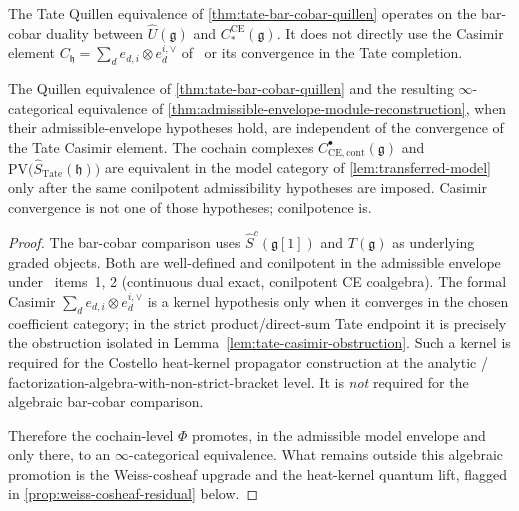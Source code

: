 The Tate Quillen equivalence of \ref{thm:tate-bar-cobar-quillen}
operates on the bar-cobar duality between $\widehat U(\mathfrak g)$
and $C_*^{\mathrm{CE}}(\mathfrak g)$. It does not directly use
the Casimir element
$C_{\mathfrak h}=\sum_d e_{d,i}\otimes e_d^{i,\vee}$
of \alpharef\ or its convergence in the Tate completion.

\begin{prop}
  \label{prop:quillen-vs-casimir}
  The Quillen equivalence of \ref{thm:tate-bar-cobar-quillen}
  and the resulting $\infty$-categorical equivalence of
  \ref{thm:admissible-envelope-module-reconstruction}, when their
  admissible-envelope hypotheses hold, are independent
  of the convergence of the Tate Casimir element. The cochain
  complexes $C^\bullet_{\mathrm{CE},\mathrm{cont}}(\mathfrak g)$
  and $\mathrm{PV}\bigl(\widehat S_{\mathrm{Tate}}(\mathfrak h)
  \bigr)$ are equivalent in the model category of
  \ref{lem:transferred-model} only after the same conilpotent
  admissibility hypotheses are imposed. Casimir convergence is not one
  of those hypotheses; conilpotence is.
\end{prop}

\begin{proof}
  The bar-cobar comparison uses
  $\widehat S^c(\mathfrak g[1])$ and $T(\mathfrak g)$ as
  underlying graded objects. Both are well-defined and conilpotent
  in the admissible envelope under \alpharef\ items~1, 2 (continuous
  dual exact, conilpotent CE coalgebra). The formal Casimir
  \(\sum_d e_{d,i}\otimes e_d^{i,\vee}\) is a kernel hypothesis only when
  it converges in the chosen coefficient category; in the strict
  product/direct-sum Tate endpoint it is precisely the obstruction
  isolated in Lemma~\ref{lem:tate-casimir-obstruction}.  Such a kernel is
  required for the Costello \cite{costello-renormalization} heat-kernel
  propagator construction at the analytic /
  factorization-algebra-with-non-strict-bracket level. It is \emph{not}
  required for the algebraic bar-cobar comparison.

  Therefore the cochain-level $\Phi$ promotes, in the admissible
  model envelope and only there, to an $\infty$-categorical equivalence. What
  remains outside this algebraic promotion is
  the Weiss-cosheaf upgrade and the heat-kernel quantum lift,
  flagged in \ref{prop:weiss-cosheaf-residual} below.
\end{proof}

